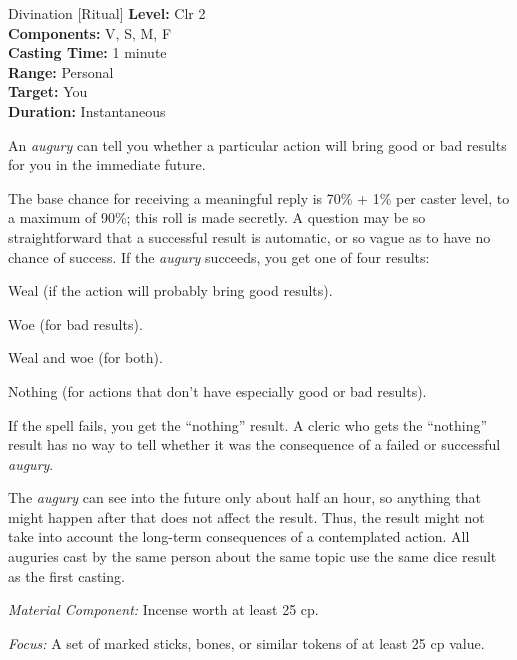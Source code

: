 {Divination [Ritual]}
{
	\textbf{Level:}
	Clr 2\\
	\textbf{Components:}
	V, S, M, F\\
	\textbf{Casting Time:}
	1 minute\\
	\textbf{Range:}
	Personal\\
	\textbf{Target:}
	You\\
	\textbf{Duration:}
	Instantaneous\\
}
{
	An \emph{augury} can tell you whether a particular action will bring good or bad results for you in the immediate future.

	The base chance for receiving a meaningful reply is 70\% + 1\% per caster level, to a maximum of 90\%; this roll is made secretly. A question may be so straightforward that a successful result is automatic, or so vague as to have no chance of success. If the \emph{augury} succeeds, you get one of four results:

\begin{itemize*}
\item Weal (if the action will probably bring good results).
\item Woe (for bad results).
\item Weal and woe (for both).
\item Nothing (for actions that don't have especially good or bad results).
\end{itemize*}

	If the spell fails, you get the ``nothing'' result. A cleric who gets the ``nothing'' result has no way to tell whether it was the consequence of a failed or successful \emph{augury}.

	The \emph{augury} can see into the future only about half an hour, so anything that might happen after that does not affect the result. Thus, the result might not take into account the long-term consequences of a contemplated action. All auguries cast by the same person about the same topic use the same dice result as the first casting.

	\textit{Material Component:}
	Incense worth at least 25 cp.

	\textit{Focus:}
	A set of marked sticks, bones, or similar tokens of at least 25 cp value.

}
